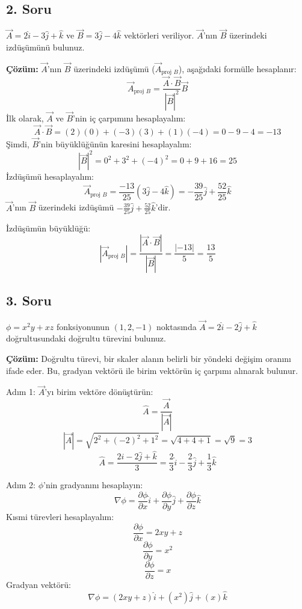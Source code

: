 \documentclass[11pt,letterpaper,twocolumn]{fenbil}
\begin{document}
\subsection*{2. Soru}
$\vec{A} = 2\hat{i} - 3\hat{j} + \hat{k}$ ve $\vec{B} = 3\hat{j} - 4\hat{k}$ vektörleri veriliyor. $\vec{A}$'nın $\vec{B}$ üzerindeki izdüşümünü bulunuz.

\textbf{Çözüm:}
$\vec{A}$'nın $\vec{B}$ üzerindeki izdüşümü ($\vec{A}_{\text{proj } B}$), aşağıdaki formülle hesaplanır:
\[
\vec{A}_{\text{proj } B} = \frac{\vec{A} \cdot \vec{B}}{|\vec{B}|^2} \vec{B}
\]
İlk olarak, $\vec{A}$ ve $\vec{B}$'nin iç çarpımını hesaplayalım:
\[
\vec{A} \cdot \vec{B} = (2)(0) + (-3)(3) + (1)(-4) = 0 - 9 - 4 = -13
\]
Şimdi, $\vec{B}$'nin büyüklüğünün karesini hesaplayalım:
\[
|\vec{B}|^2 = 0^2 + 3^2 + (-4)^2 = 0 + 9 + 16 = 25
\]
İzdüşümü hesaplayalım:
\[
\vec{A}_{\text{proj } B} = \frac{-13}{25} (3\hat{j} - 4\hat{k}) = -\frac{39}{25}\hat{j} + \frac{52}{25}\hat{k}
\]
$\vec{A}$'nın $\vec{B}$ üzerindeki izdüşümü $-\frac{39}{25}\hat{j} + \frac{52}{25}\hat{k}$'dir.

İzdüşümün büyüklüğü:
\[
|\vec{A}_{\text{proj } B}| = \frac{|\vec{A} \cdot \vec{B}|}{|\vec{B}|} = \frac{|-13|}{5} = \frac{13}{5}
\]

\subsection*{3. Soru}
$\phi = x^2y + xz$ fonksiyonunun $(1, 2, -1)$ noktasında $\vec{A} = 2\hat{i} - 2\hat{j} + \hat{k}$ doğrultusundaki doğrultu türevini bulunuz.

\textbf{Çözüm:}
Doğrultu türevi, bir skaler alanın belirli bir yöndeki değişim oranını ifade eder. Bu, gradyan vektörü ile birim vektörün iç çarpımı alınarak bulunur.

Adım 1: $\vec{A}$'yı birim vektöre dönüştürün:
\[
\hat{A} = \frac{\vec{A}}{|\vec{A}|}
\]
\[
|\vec{A}| = \sqrt{2^2 + (-2)^2 + 1^2} = \sqrt{4 + 4 + 1} = \sqrt{9} = 3
\]
\[
\hat{A} = \frac{2\hat{i} - 2\hat{j} + \hat{k}}{3} = \frac{2}{3}\hat{i} - \frac{2}{3}\hat{j} + \frac{1}{3}\hat{k}
\]

Adım 2: $\phi$'nin gradyanını hesaplayın:
\[
\nabla \phi = \frac{\partial \phi}{\partial x}\hat{i} + \frac{\partial \phi}{\partial y}\hat{j} + \frac{\partial \phi}{\partial z}\hat{k}
\]
Kısmi türevleri hesaplayalım:
\[
\frac{\partial \phi}{\partial x} = 2xy + z
\]
\[
\frac{\partial \phi}{\partial y} = x^2
\]
\[
\frac{\partial \phi}{\partial z} = x
\]
Gradyan vektörü:
\[
\nabla \phi = (2xy + z)\hat{i} + (x^2)\hat{j} + (x)\hat{k}
\]
\end{document}
